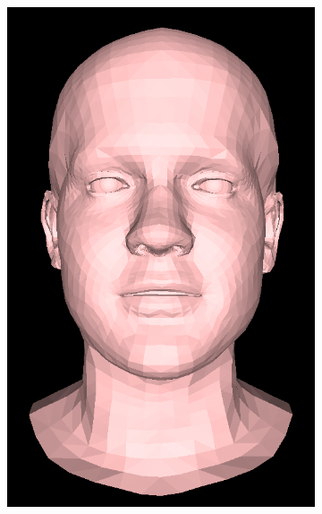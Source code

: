 \begin{figure}[h!]
\begin{subfigure}[b]{0.19\textwidth}
        \includegraphics[width=\textwidth]{figures/gen_sample/00011.png}
    \end{subfigure}
    \begin{subfigure}[b]{0.19\textwidth}

\end{subfigure}
\end{figure}

